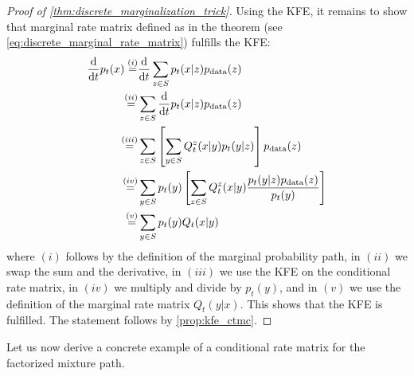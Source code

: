 \begin{proof}[Proof of \cref{thm:discrete_marginalization_trick}]
Using the KFE, it remains to show that marginal rate matrix defined as in the theorem (see \cref{eq:discrete_marginal_rate_matrix}) fulfills the KFE:
\begin{align*}
\frac{\mathrm{d}}{\mathrm{d} t}p_t(x)\overset{(i)}{=}&\frac{\mathrm{d}}{\mathrm{d} t}\sum\limits_{z\in S}p_t(x|z)p_{\rm{data}}(z)\\
\overset{(ii)}{=}&\sum\limits_{z\in S}\frac{\mathrm{d}}{\mathrm{d} t}p_t(x|z)p_{\rm{data}}(z)\\
\overset{(iii)}{=}&\sum\limits_{z\in S}\left[\sum\limits_{y\in S}Q_t^z(x|y)p_t(y|z)\right]p_{\rm{data}}(z)\\
\overset{(iv)}{=}&\sum\limits_{y\in S}p_t(y)\left[\sum\limits_{z\in S}Q_t^z(x|y)\frac{p_t(y|z)p_{\rm{data}}(z)}{p_t(y)}\right]\\
\overset{(v)}{=}&\sum\limits_{y\in S}p_t(y)Q_t(x|y)
\end{align*}
where $(i)$ follows by the definition of the marginal probability path, in $(ii)$ we swap the sum and the derivative, in $(iii)$ we use the KFE on the conditional rate matrix, in $(iv)$ we multiply and divide by $p_t(y)$, and in $(v)$ we use the definition of the marginal rate matrix $Q_t(y|x)$. This shows that the KFE is fulfilled. The statement follows by \cref{prop:kfe_ctmc}.
\end{proof}
Let us now derive a concrete example of a conditional rate matrix for the factorized mixture path.
